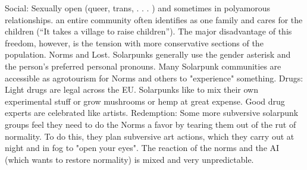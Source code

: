 Social: Sexually open (queer, trans, . . . ) and sometimes in polyamorous relationships. an entire community often identifies as one family and cares for the children (“It takes a village to raise children”).
The major disadvantage of this freedom, however, is the tension with more conservative sections of the population. Norms and Lost. Solarpunks generally use the gender asterisk and the person's preferred personal pronouns. Many Solarpunk communities are accessible as agrotourism for Norms and others to "experience" something.
Drugs: Light drugs are legal across the EU. Solarpunks like to mix their own experimental stuff or grow mushrooms or hemp at great expense. Good drug experts are celebrated like artists.
Redemption: Some more subversive solarpunk groups feel they need to do the Norms a favor by tearing them out of the rut of normality. To do this, they plan subversive art actions, which they carry out at night and in fog to "open your eyes". The reaction of the norms and the AI (which wants to restore normality) is mixed and very unpredictable.


